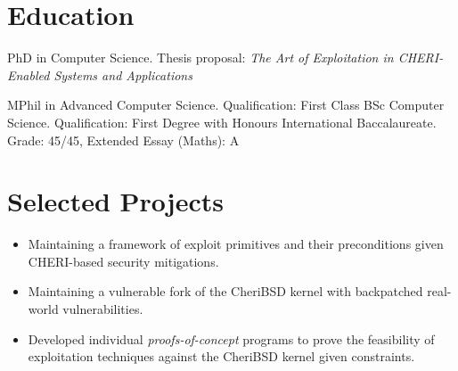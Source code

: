 \documentclass{resume}
\begin{document}



\section{Education}
PhD in Computer Science.
Thesis proposal: \textit{The Art of Exploitation in CHERI-Enabled Systems and Applications}

MPhil in Advanced Computer Science. %
Qualification: First Class
BSc Computer Science. %
Qualification: First Degree with Honours
International Baccalaureate. Grade: 45/45, Extended Essay (Maths): A


\section{Selected Projects}

\begin{itemize}
  \item Maintaining a framework of exploit primitives and their preconditions given CHERI-based security mitigations.
  \item Maintaining a vulnerable fork of the CheriBSD kernel with backpatched real-world vulnerabilities.
  \item Developed individual \textit{proofs-of-concept} programs to prove the feasibility of exploitation techniques against the CheriBSD kernel given constraints.
\end{itemize}
\end{document}
